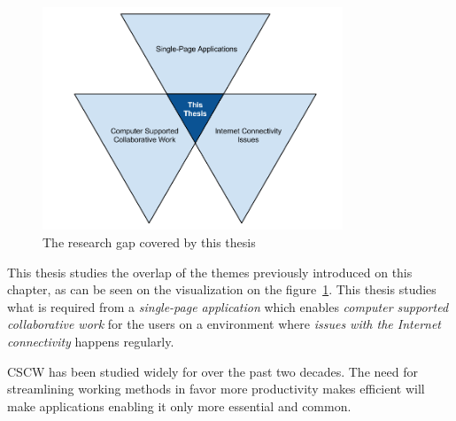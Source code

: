 


\begin{figure}[t]
\begin{center}
\includegraphics[width=0.8\textwidth]{assets/researchgap.png}
\end{center}
\caption{The research gap covered by this thesis}
\label{fig:researchgap}
\end{figure}

This thesis studies the overlap of the themes previously introduced on this chapter, as can be seen on the visualization on the figure~\ref{fig:researchgap}. This thesis studies what is required from a \textit{single-page application} which enables \textit{computer supported collaborative work} for the users on a environment where \textit{issues with the Internet connectivity} happens regularly. 

CSCW has been studied widely for over the past two decades. The need for streamlining working methods in favor more productivity makes efficient will make applications enabling it only more essential and common.  

